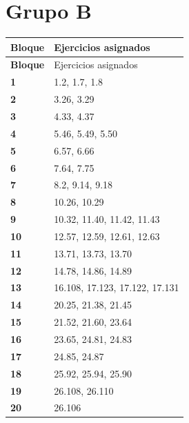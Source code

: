 \documentclass[11pt,letterpaper]{article}
\begin{document}
\section*{Grupo B}
\small
\begin{longtable}{>{\bfseries}p{2cm}p{13.5cm}}
\toprule Bloque & Ejercicios asignados \\ \midrule
\endfirsthead
\toprule Bloque & Ejercicios asignados \\ \midrule
\endhead
1 & 1.2, 1.7, 1.8 \\
2 & 3.26, 3.29 \\
3 & 4.33, 4.37 \\
4 & 5.46, 5.49, 5.50 \\
5 & 6.57, 6.66 \\
6 & 7.64, 7.75 \\
7 & 8.2, 9.14, 9.18 \\
8 & 10.26, 10.29 \\
9 & 10.32, 11.40, 11.42, 11.43 \\
10 & 12.57, 12.59, 12.61, 12.63 \\
11 & 13.71, 13.73, 13.70 \\
12 & 14.78, 14.86, 14.89 \\
13 & 16.108, 17.123, 17.122, 17.131 \\
14 & 20.25, 21.38, 21.45 \\
15 & 21.52, 21.60, 23.64 \\
16 & 23.65, 24.81, 24.83 \\
17 & 24.85, 24.87 \\
18 & 25.92, 25.94, 25.90 \\
19 & 26.108, 26.110 \\
20 & 26.106 \\
\bottomrule
\end{longtable}
\normalsize
\clearpage
\end{document}
